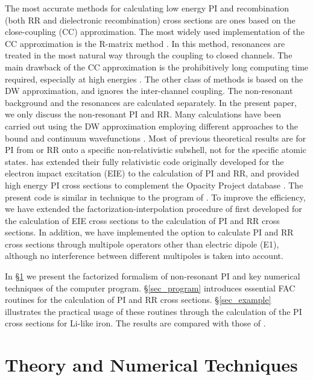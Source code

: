 \documentclass{elsart}
\begin{document}
The most accurate methods for calculating low energy PI and
recombination (both RR and dielectronic recombination) cross sections are ones
based on the close-coupling (CC) approximation. The most widely used
implementation of the CC approximation is the 
R-matrix method \citep{hummer93, berrington95}. In this method, resonances are
treated in the most natural way through the coupling to closed channels. The
main drawback of the CC approximation is the prohibitively long computing time
required, especially at high energies \citep{zhang98}. The other class of
methods is based on the DW approximation, and ignores the inter-channel
coupling. The non-resonant background and the resonances are calculated
separately. In the present paper, we only discuss the non-resonant
PI and RR. Many calculations have been carried out using the DW approximation
employing different approaches to the bound and continuum wavefunctions
\citep{reilman79, clark86, verner93}. Most of previous theoretical results are
for PI from or RR onto a specific non-relativistic subshell, not for the
specific atomic states. \citet{zhang98} has extended their fully relativistic
code originally developed for the electron impact excitation (EIE) to the
calculation of PI and RR, and provided high energy PI cross sections to
complement the Opacity Project database \citep{seaton87}. The
present code is similar in technique to the program of \citet{zhang98}. To
improve the efficiency, we have extended the factorization-interpolation
procedure of \citet{barshalom88} first developed for the calculation of EIE
cross sections to the calculation of PI and RR cross sections. 
In addition, we have implemented the option to calculate PI and RR cross
sections through multipole operators other than electric dipole (E1), although
no interference between different multipoles is taken into account. 

In \S\ref{sec_theory} we present the factorized formalism of non-resonant PI 
and key numerical techniques of the computer program. \S\ref{sec_program}
introduces essential FAC routines for the calculation of PI and RR cross
sections. \S\ref{sec_example} illustrates the practical usage of these
routines through the calculation of the PI cross sections for Li-like
iron. The results are compared with those of \citet{zhang98}.

\section{Theory and Numerical Techniques}
\label{sec_theory}
\end{document}
